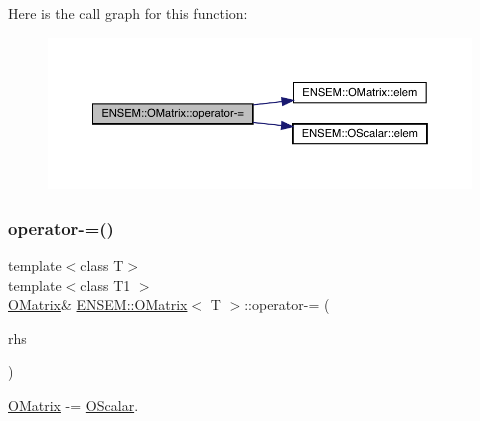 Here is the call graph for this function\+:
\nopagebreak
\begin{figure}[H]
\begin{center}
\leavevmode
\includegraphics[width=350pt]{dd/d80/classENSEM_1_1OMatrix_a53a1a690a2f39f0c64c6d261efc00e4c_cgraph}
\end{center}
\end{figure}
\mbox{\label{classENSEM_1_1OMatrix_a53a1a690a2f39f0c64c6d261efc00e4c}} 
\subsubsection{\texorpdfstring{operator-\/=()}{operator-=()}\hspace{0.1cm}{\footnotesize\ttfamily [5/6]}}
{\footnotesize\ttfamily template$<$class T$>$ \\
template$<$class T1 $>$ \\
\mbox{\hyperlink{classENSEM_1_1OMatrix}{O\+Matrix}}\& \mbox{\hyperlink{classENSEM_1_1OMatrix}{E\+N\+S\+E\+M\+::\+O\+Matrix}}$<$ T $>$\+::operator-\/= (\begin{DoxyParamCaption}\item[{const \mbox{\hyperlink{classENSEM_1_1OScalar}{O\+Scalar}}$<$ T1 $>$ \&}]{rhs }\end{DoxyParamCaption})\hspace{0.3cm}{\ttfamily [inline]}}



\mbox{\hyperlink{classENSEM_1_1OMatrix}{O\+Matrix}} -\/= \mbox{\hyperlink{classENSEM_1_1OScalar}{O\+Scalar}}. 

